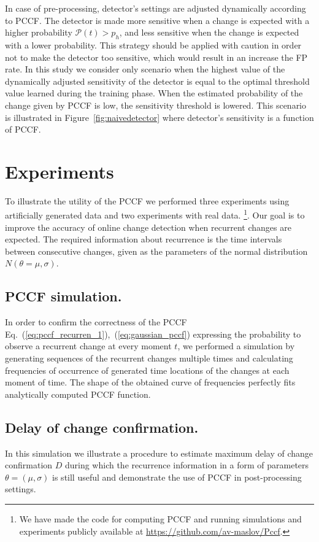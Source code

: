 In case of pre-processing, detector's settings are adjusted dynamically according to PCCF. The detector is made more sensitive when a change is expected with a higher probability $\mathcal{P}(t) > p_h$, and less sensitive when the change is expected with a lower probability.
This strategy should be applied with caution in order not to make the detector too sensitive, which would result in an increase the FP rate.
In this study we consider only scenario when the highest value of the dynamically adjusted sensitivity of the detector is equal to the optimal threshold value learned during the training phase.
When the estimated probability of the change given by PCCF is low, the sensitivity threshold is lowered.
This scenario is illustrated in Figure~\ref{fig:naivedetector} where detector's sensitivity is a function of PCCF.

\section{Experiments}
\label{sec:experiments}
To illustrate the utility of the PCCF we performed three experiments using artificially generated data and two experiments with real data.
\footnote{We have made the code for computing PCCF and running simulations and experiments publicly available at \url{https://github.com/av-maslov/Pccf}.}.
Our goal is to improve the accuracy of online change detection when recurrent changes are expected.
The required information about recurrence is the time intervals between consecutive changes, given as the parameters of the normal distribution $N(\theta = \mu, \sigma)$.

\subsection{PCCF simulation.}
In order to confirm the correctness of the PCCF Eq.~(\ref{eq:pccf_recurren_1}),~(\ref{eq:gaussian_pccf}) expressing the probability to observe a recurrent change at every moment $t$, we performed a simulation by generating sequences of the recurrent changes multiple times and calculating frequencies of occurrence of generated time locations of the changes at each moment of time.
The shape of the obtained curve of frequencies perfectly fits analytically computed PCCF function.

\subsection{Delay of change confirmation.}
In this simulation we illustrate a procedure to estimate maximum delay of change confirmation $D$ during which the recurrence information in a form of parameters $\theta = (\mu, \sigma)$ is still useful and demonstrate the use of PCCF in post-processing settings.

